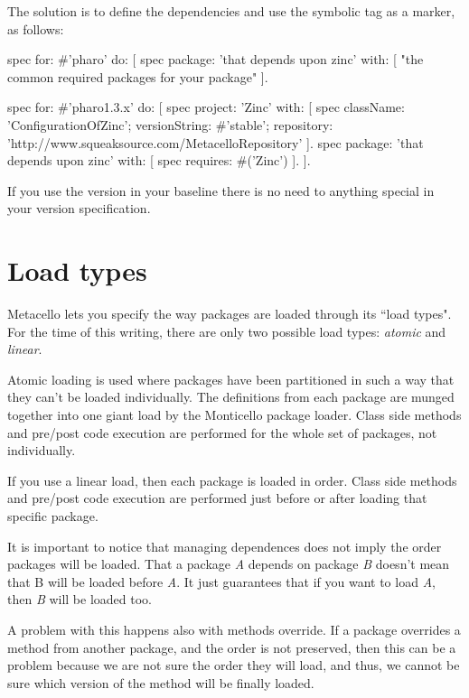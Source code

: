 \documentclass[a4paper,10pt,twoside]{book}
\begin{document}
The solution is to define the dependencies and use the symbolic tag as a marker, as follows: 

\begin{code}{}
spec for: #'pharo' do: [
   spec package: 'that depends upon zinc' with: [
     "the common required packages for your package"
   ].
   
spec for: #'pharo1.3.x' do: [
   spec project: 'Zinc' with: [
       spec
           className: 'ConfigurationOfZinc';
           versionString: #'stable';
           repository: 'http://www.squeaksource.com/MetacelloRepository' ].
   spec package: 'that depends upon zinc' with: [
       spec requires: #('Zinc') ].
].
\end{code}

If you use the  version in your baseline there is no need to anything special in your version specification.




\section{Load types}
Metacello lets you specify the way packages are loaded through its ``load types". For the time of this writing, there are only two possible load types: \emph{atomic} and \emph{linear}. 

Atomic loading is used where packages have been partitioned in such a way that they can't be loaded individually. The definitions from each package are munged together into one giant load by the Monticello package loader. Class side  methods and pre/post code execution are performed for the whole set of packages, not individually. 

If you use a linear load, then each package is loaded in order. Class side  methods and pre/post code execution are performed just before or after loading that specific package.

It is important to notice that managing dependences does not imply the order packages will be loaded. That a package \emph{A} depends on package \emph{B} doesn't mean that B will be loaded before \emph{A}. It just guarantees that if you want to load \emph{A}, then \emph{B} will be loaded too. 

A problem with this happens also with methods override. If a package overrides a method from another package, and the order is not preserved, then this can be a problem because we are not sure the order they will load, and thus, we cannot be sure which version of the method will be finally loaded. 
\end{document}
